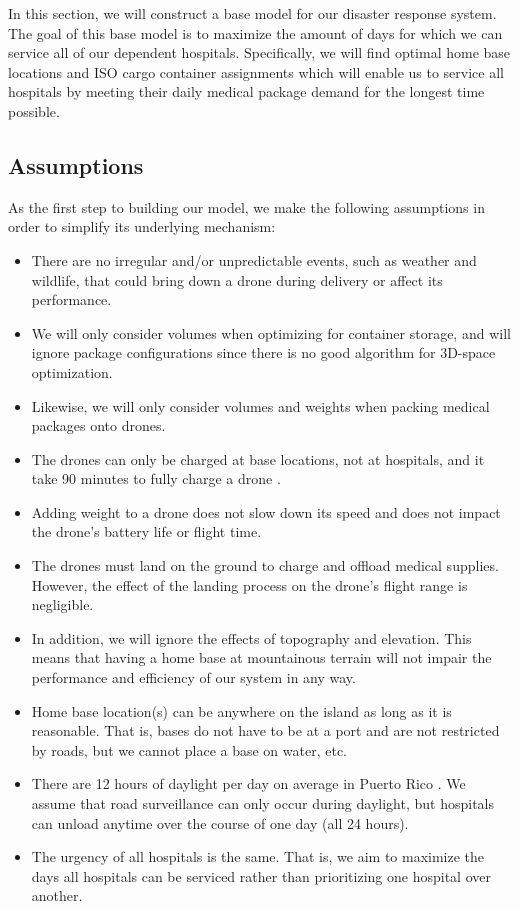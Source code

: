 In this section, we will construct a base model for our disaster response system. The goal of this base model is to maximize the amount of days for which we can service all of our dependent hospitals. Specifically, we will find optimal home base locations and ISO cargo container assignments which will enable us to service all hospitals by meeting their daily medical package demand for the longest time possible.

\subsection{Assumptions}
As the first step to building our model, we make the following assumptions in order to simplify its underlying mechanism:

\begin{itemize}
    \item There are no irregular and/or unpredictable events, such as weather and wildlife, that could bring down a drone during delivery or affect its performance.
    \item We will only consider volumes when optimizing for container storage, and will ignore package configurations since there is no good algorithm for 3D-space optimization.
    \item Likewise, we will only consider volumes and weights when packing medical packages onto drones.
    \item The drones can only be charged at base locations, not at hospitals, and it take 90 minutes to fully charge a drone \cite{drones_charge}. 
    \item Adding weight to a drone does not slow down its speed and does not impact the drone’s battery life or flight time.
    \item The drones must land on the ground to charge and offload medical supplies. However, the effect of the landing process on the drone's flight range is negligible.
    \item In addition, we will ignore the effects of topography and elevation. This means that having a home base at mountainous terrain will not impair the performance and efficiency of our system in any way.
    \item Home base location(s) can be anywhere on the island as long as it is reasonable. That is, bases do not have to be at a port and are not restricted by roads, but we cannot place a base on water, etc. 
	\item There are 12 hours of daylight per day on average in Puerto Rico \cite{avg_daylight}. We assume that road surveillance can only occur during daylight, but hospitals can unload anytime over the course of one day (all 24 hours).
	\item The urgency of all hospitals is the same. That is, we aim to maximize the days all hospitals can be serviced rather than prioritizing one hospital over another. 
\end{itemize}

